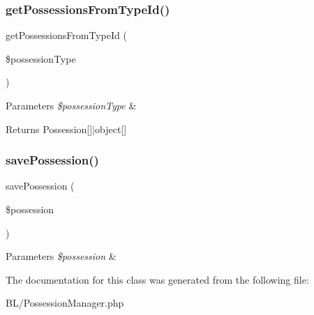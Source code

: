 \subsubsection{\texorpdfstring{getPossessionsFromTypeId()}{getPossessionsFromTypeId()}}
{\footnotesize\ttfamily get\+Possessions\+From\+Type\+Id (\begin{DoxyParamCaption}\item[{}]{\$possession\+Type }\end{DoxyParamCaption})}


\begin{DoxyParams}{Parameters}
{\em \$possession\+Type} & \\
\hline
\end{DoxyParams}
\begin{DoxyReturn}{Returns}
Possession\mbox{[}\mbox{]}$\vert$object\mbox{[}\mbox{]} 
\end{DoxyReturn}
\mbox{\label{class_app_1_1_b_l_1_1_possession_manager_ae819e57682c3d821eb58dc48c10b0f3d}} 
\subsubsection{\texorpdfstring{savePossession()}{savePossession()}}
{\footnotesize\ttfamily save\+Possession (\begin{DoxyParamCaption}\item[{}]{\$possession }\end{DoxyParamCaption})}


\begin{DoxyParams}{Parameters}
{\em \$possession} & \\
\hline
\end{DoxyParams}


The documentation for this class was generated from the following file\+:\begin{DoxyCompactItemize}
\item 
B\+L/Possession\+Manager.\+php\end{DoxyCompactItemize}
